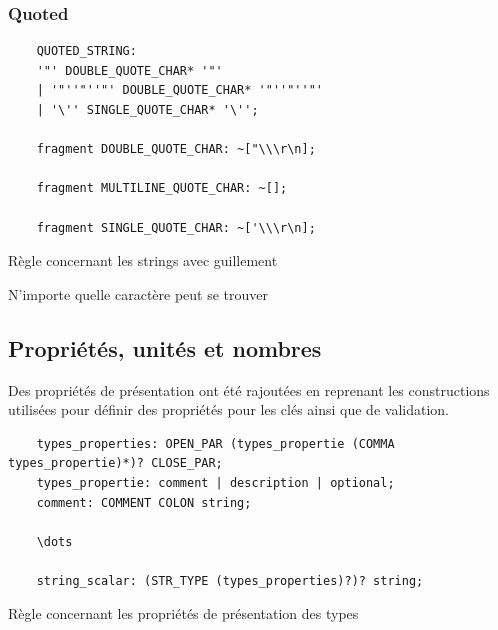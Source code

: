 \documentclass[
    iict, %
    il, %
]{heig-tb}
\begin{document}

\subsubsection{Quoted}

\begin{listing}[!ht]
    \begin{verbatim}
    QUOTED_STRING:
    '"' DOUBLE_QUOTE_CHAR* '"'
    | '"''"''"' DOUBLE_QUOTE_CHAR* '"''"''"'
    | '\'' SINGLE_QUOTE_CHAR* '\'';

    fragment DOUBLE_QUOTE_CHAR: ~["\\\r\n];

    fragment MULTILINE_QUOTE_CHAR: ~[];

    fragment SINGLE_QUOTE_CHAR: ~['\\\r\n];
    \end{verbatim}
    \caption{Règle concernant les strings avec guillement}
    \label{quoted-rule}
\end{listing}

N'importe quelle caractère peut se trouver


\subsection{Propriétés, unités et nombres}

Des propriétés de présentation ont été rajoutées en reprenant les constructions utilisées pour définir des propriétés pour les clés ainsi que de validation.

\begin{listing}[!ht]
    \begin{verbatim}
    types_properties: OPEN_PAR (types_propertie (COMMA types_propertie)*)? CLOSE_PAR;
    types_propertie: comment | description | optional;
    comment: COMMENT COLON string;

    \dots

    string_scalar: (STR_TYPE (types_properties)?)? string;
    \end{verbatim}
    \caption{Règle concernant les propriétés de présentation des types}
    \label{types_properties-rule}
\end{listing}
\end{document}
